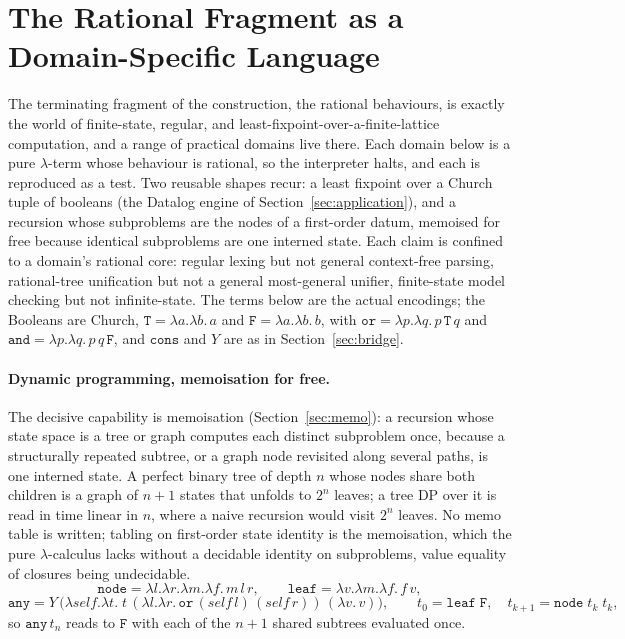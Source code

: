 \section{The Rational Fragment as a Domain-Specific Language}\label{app:dsl}
The terminating fragment of the construction, the rational behaviours, is exactly the world of
finite-state, regular, and least-fixpoint-over-a-finite-lattice computation, and a range of
practical domains live there. Each domain below is a pure $\lambda$-term whose behaviour is
rational, so the interpreter halts, and each is reproduced as a test. Two reusable shapes recur: a least fixpoint over a Church
tuple of booleans (the Datalog engine of Section~\ref{sec:application}), and a recursion whose
subproblems are the nodes of a first-order datum, memoised for free because identical subproblems
are one interned state. Each claim is confined to a domain's rational core: regular lexing but not
general context-free parsing, rational-tree unification but not a general most-general unifier,
finite-state model checking but not infinite-state. The terms below are the actual encodings; the
Booleans are Church, $\mathtt{T} = \lambda a.\lambda b.\,a$ and $\mathtt{F} = \lambda a.\lambda b.\,b$,
with $\mathtt{or} = \lambda p.\lambda q.\,p\,\mathtt{T}\,q$ and
$\mathtt{and} = \lambda p.\lambda q.\,p\,q\,\mathtt{F}$, and $\mathtt{cons}$ and $Y$ are as in
Section~\ref{sec:bridge}.

\paragraph{Dynamic programming, memoisation for free.}
The decisive capability is memoisation (Section~\ref{sec:memo}): a recursion whose state space is a
tree or graph computes each distinct subproblem once, because a structurally repeated subtree, or a
graph node revisited along several paths, is one interned state. A perfect binary tree of depth $n$
whose nodes share both children is a graph of $n+1$ states that unfolds to $2^{n}$ leaves; a tree
DP over it is read in time linear in $n$, where a naive recursion would visit $2^{n}$ leaves. No
memo table is written; tabling on first-order state identity is the memoisation, which the pure
$\lambda$-calculus lacks without a decidable identity on subproblems, value equality of closures
being undecidable.
\[
  \mathtt{node} = \lambda l.\lambda r.\lambda m.\lambda f.\,m\,l\,r, \qquad
  \mathtt{leaf} = \lambda v.\lambda m.\lambda f.\,f\,v,
\]
\[
  \mathtt{any} = Y\,\big(\lambda\mathit{self}.\lambda t.\;
  t\,(\lambda l.\lambda r.\,\mathtt{or}\,(\mathit{self}\,l)\,(\mathit{self}\,r))\,(\lambda v.\,v)\big),
  \qquad t_0 = \mathtt{leaf}\;\mathtt{F},\quad t_{k+1} = \mathtt{node}\;t_k\;t_k,
\]
so $\mathtt{any}\,t_n$ reads to $\mathtt{F}$ with each of the $n+1$ shared subtrees evaluated once.

